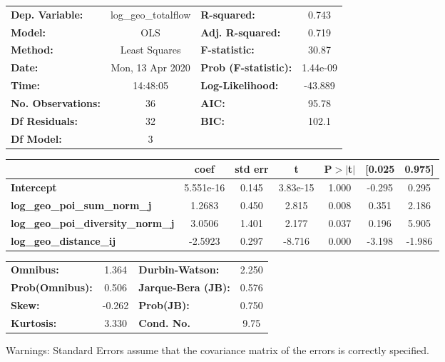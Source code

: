 \begin{center}
\begin{tabular}{lclc}
\toprule
\textbf{Dep. Variable:}                    & log\_geo\_totalflow & \textbf{  R-squared:         } &     0.743   \\
\textbf{Model:}                            &         OLS         & \textbf{  Adj. R-squared:    } &     0.719   \\
\textbf{Method:}                           &    Least Squares    & \textbf{  F-statistic:       } &     30.87   \\
\textbf{Date:}                             &   Mon, 13 Apr 2020  & \textbf{  Prob (F-statistic):} &  1.44e-09   \\
\textbf{Time:}                             &       14:48:05      & \textbf{  Log-Likelihood:    } &   -43.889   \\
\textbf{No. Observations:}                 &            36       & \textbf{  AIC:               } &     95.78   \\
\textbf{Df Residuals:}                     &            32       & \textbf{  BIC:               } &     102.1   \\
\textbf{Df Model:}                         &             3       & \textbf{                     } &             \\
\bottomrule
\end{tabular}
\begin{tabular}{lcccccc}
                                           & \textbf{coef} & \textbf{std err} & \textbf{t} & \textbf{P$> |$t$|$} & \textbf{[0.025} & \textbf{0.975]}  \\
\midrule
\textbf{Intercept}                         &    5.551e-16  &        0.145     &  3.83e-15  &         1.000        &       -0.295    &        0.295     \\
\textbf{log\_geo\_poi\_sum\_norm\_j}       &       1.2683  &        0.450     &     2.815  &         0.008        &        0.351    &        2.186     \\
\textbf{log\_geo\_poi\_diversity\_norm\_j} &       3.0506  &        1.401     &     2.177  &         0.037        &        0.196    &        5.905     \\
\textbf{log\_geo\_distance\_ij}            &      -2.5923  &        0.297     &    -8.716  &         0.000        &       -3.198    &       -1.986     \\
\bottomrule
\end{tabular}
\begin{tabular}{lclc}
\textbf{Omnibus:}       &  1.364 & \textbf{  Durbin-Watson:     } &    2.250  \\
\textbf{Prob(Omnibus):} &  0.506 & \textbf{  Jarque-Bera (JB):  } &    0.576  \\
\textbf{Skew:}          & -0.262 & \textbf{  Prob(JB):          } &    0.750  \\
\textbf{Kurtosis:}      &  3.330 & \textbf{  Cond. No.          } &     9.75  \\
\bottomrule
\end{tabular}
\end{center}

Warnings: \newline
 [1] Standard Errors assume that the covariance matrix of the errors is correctly specified.